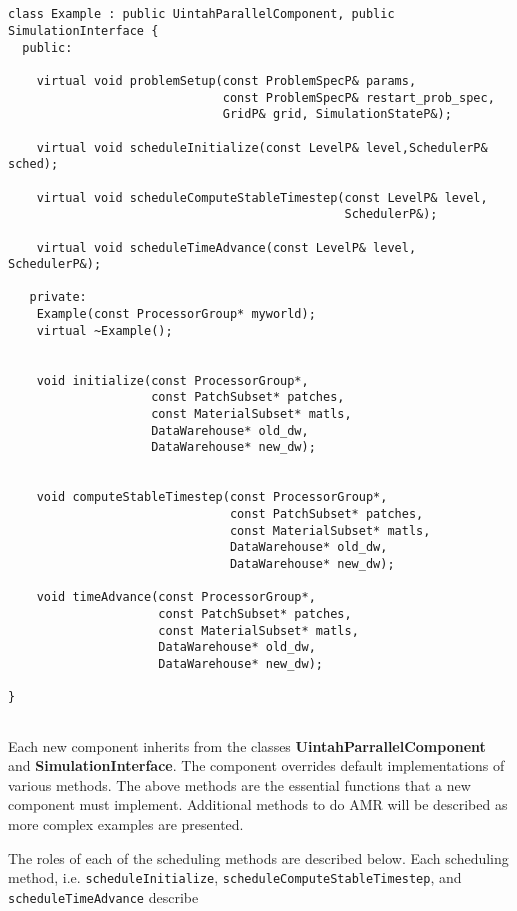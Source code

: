 \documentclass[12pt]{report}
\begin{document}
\begin{verbatim}


class Example : public UintahParallelComponent, public SimulationInterface {
  public:

    virtual void problemSetup(const ProblemSpecP& params, 
                              const ProblemSpecP& restart_prob_spec, 
                              GridP& grid, SimulationStateP&);

    virtual void scheduleInitialize(const LevelP& level,SchedulerP& sched);
                                    
    virtual void scheduleComputeStableTimestep(const LevelP& level, 
                                               SchedulerP&);
                                               
    virtual void scheduleTimeAdvance(const LevelP& level, SchedulerP&);

   private:
    Example(const ProcessorGroup* myworld);
    virtual ~Example();


    void initialize(const ProcessorGroup*,
                    const PatchSubset* patches, 
                    const MaterialSubset* matls,
                    DataWarehouse* old_dw, 
                    DataWarehouse* new_dw);
                    
                    
    void computeStableTimestep(const ProcessorGroup*,
                               const PatchSubset* patches,
                               const MaterialSubset* matls,
                               DataWarehouse* old_dw,
                               DataWarehouse* new_dw);
                               
    void timeAdvance(const ProcessorGroup*,
                     const PatchSubset* patches,
                     const MaterialSubset* matls,
                     DataWarehouse* old_dw,
                     DataWarehouse* new_dw);

}


\end{verbatim}


Each new component inherits from the classes
\textbf{UintahParrallelComponent} and \textbf{SimulationInterface}.
The component overrides default implementations of various methods.
The above methods are the essential functions that a new component
must implement.  Additional methods to do AMR will be described as
more complex examples are presented.

The roles of each of the scheduling methods are described below.  Each
scheduling method, i.e. \texttt{scheduleInitialize},
\texttt{scheduleComputeStableTimestep}, and
\texttt{scheduleTimeAdvance} describe
\end{document}
